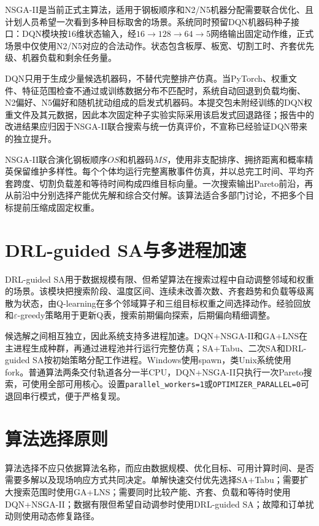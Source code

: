 \documentclass[UTF8,zihao=-4,openany]{ctexrep}
\newcommand{\code}[1]{\texttt{#1}}
\begin{document}
NSGA-II是当前正式主算法，适用于钢板顺序和N2/N5机器分配需要联合优化、且计划人员希望一次看到多种目标取舍的场景。系统同时预留DQN机器码种子接口：DQN模块按16维状态输入，经$16\rightarrow128\rightarrow64\rightarrow5$网络输出固定动作维，正式场景中仅使用N2/N5对应的合法动作。状态包含板厚、板宽、切割工时、齐套优先级、机器负载和剩余任务量。

DQN只用于生成少量候选机器码，不替代完整排产仿真。当PyTorch、权重文件、特征范围检查不通过或训练数据分布不匹配时，系统自动回退到负载均衡、N2偏好、N5偏好和随机扰动组成的启发式机器码。本提交包未附经训练的DQN权重文件及其元数据，因此本次固定种子实验实际采用该启发式回退路径；报告中的改进结果应归因于NSGA-II联合搜索与统一仿真评价，不宣称已经验证DQN带来的独立提升。

NSGA-II联合演化钢板顺序$OS$和机器码$MS$，使用非支配排序、拥挤距离和概率精英保留维护多样性。每个个体均运行完整离散事件仿真，并以总完工时间、平均齐套跨度、切割负载差和等待时间构成四维目标向量。一次搜索输出Pareto前沿，再从前沿中分别选择产能优先解和综合交付解。该算法适合多部门讨论，不把多个目标提前压缩成固定权重。

\section{DRL-guided SA与多进程加速}

DRL-guided SA用于数据规模有限、但希望算法在搜索过程中自动调整邻域和权重的场景。该模块把搜索阶段、温度区间、连续未改善次数、齐套趋势和负载等级离散为状态，由Q-learning在多个邻域算子和三组目标权重之间选择动作。经验回放和$\varepsilon$-greedy策略用于更新Q表，搜索前期偏向探索，后期偏向精细调整。

候选解之间相互独立，因此系统支持多进程加速。DQN+NSGA-II和GA+LNS在主进程生成种群，再通过进程池并行运行完整仿真；SA+Tabu、二次SA和DRL-guided SA按初始策略分配工作进程。Windows使用spawn，类Unix系统使用fork。普通算法两条交付轨道各分一半CPU，DQN+NSGA-II只执行一次Pareto搜索，可使用全部可用核心。设置\code{parallel\_workers=1}或\code{OPTIMIZER\_PARALLEL=0}可退回串行模式，便于严格复现。

\section{算法选择原则}

算法选择不应只依据算法名称，而应由数据规模、优化目标、可用计算时间、是否需要多解以及现场响应方式共同决定。单解快速交付优先选择SA+Tabu；需要扩大搜索范围时使用GA+LNS；需要同时比较产能、齐套、负载和等待时使用DQN+NSGA-II；数据有限但希望自动调参时使用DRL-guided SA；故障和订单扰动则使用动态修复路径。
\end{document}
